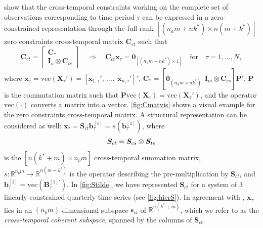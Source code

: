 \documentclass[a4paper,11pt]{article}
\newcommand{\bvet}{\bm{b}}
\newcommand{\xvet}{\bm{x}}
\newcommand{\Bvet}{\bm{B}}
\newcommand{\Cvet}{\bm{C}}
\newcommand{\Ivet}{\bm{I}}
\newcommand{\Pvet}{\bm{P}}
\newcommand{\Svet}{\bm{S}}
\newcommand{\Xvet}{\bm{X}}
\newcommand{\Zerovet}{\bm{0}}
\theoremstyle{definition}
\begin{document}
\cite{difonzo2023} show that the cross-temporal constraints working on the complete set of observations corresponding to time period $\tau$ can be expressed in a zero-constrained representation through the full rank $\left[(n_am+nk^\ast)\times n(m+k^\ast)\right]$ zero constraints cross-temporal matrix $\Cvet_{ct}$ such that
\begin{equation}
	\label{eq:Cct}
	\Cvet_{ct} = \begin{bmatrix}
		\Cvet_\ast \\
		\Ivet_n \otimes \Cvet_{te}
	\end{bmatrix} \quad \Longrightarrow \quad
	\Cvet_{ct} \xvet_{\tau} = \Zerovet_{[(n_am+nk^\ast)\times1]} \quad \mathrm{for} \quad \tau = 1,\dots,N,
\end{equation}
where $\xvet_{\tau} = \mathrm{vec}(\Xvet_{\tau}') = [\xvet_{1, \tau}',~ 	\dots, ~ \xvet_{n, \tau}']'$, $\Cvet_\ast = [\Zerovet_{(n_a m\times nk^\ast)} ~~ \Ivet_m \otimes \Cvet_{cs}]\Pvet'$, $\Pvet$ is the commutation matrix \citep[][p. 54]{magnus2019} such that $\Pvet \mathrm{vec}(\Xvet_{\tau}) = \mathrm{vec}(\Xvet_{\tau}')$, and the operator $\mathrm{vec}(\cdot)$ converts a matrix into a vector. \autoref{fig:Cmatvis} shows a visual example for the zero constraints cross-temporal matrix.
A structural representation can be considered as well: $\xvet_\tau = \Svet_{ct}\bvet^{[1]}_\tau = s(\bvet_{\tau}^{[1]})$, where \vspace{-0.1cm}
\begin{equation}
	\label{eq:Sct}
	\Svet_{ct} = \Svet_{cs} \otimes \Svet_{te}
	\vspace{-0.1cm}
\end{equation}
is the $\left[n(k^\ast+m)\times n_b m\right]$ cross-temporal summation matrix, $s: \mathbb{R}^{n_b m} \rightarrow \mathbb{R}^{n(m+k^\ast)}$ is the operator describing the pre-multiplication by $\Svet_{ct}$, and $\bvet^{[1]}_\tau = \mathrm{vec}(\Bvet^{[1]\prime}_{\tau})$. In \autoref{fig:Stilde}, we have represented $\Svet_{ct}$ for a system of 3 linearly constrained quarterly time series (see \autoref{fig:hierS}).
In agreement with \cite{panagiotelis2021}, $\xvet_{\tau}$ lies in an $(n_b m)$-dimensional subspace $\mathfrak{s}_{ct}$ of $\mathbb{R}^{n(k^\ast+m)}$, which we refer to as the \textit{cross-temporal coherent subspace}, spanned by the columns of $\Svet_{ct}$.


\end{document}
